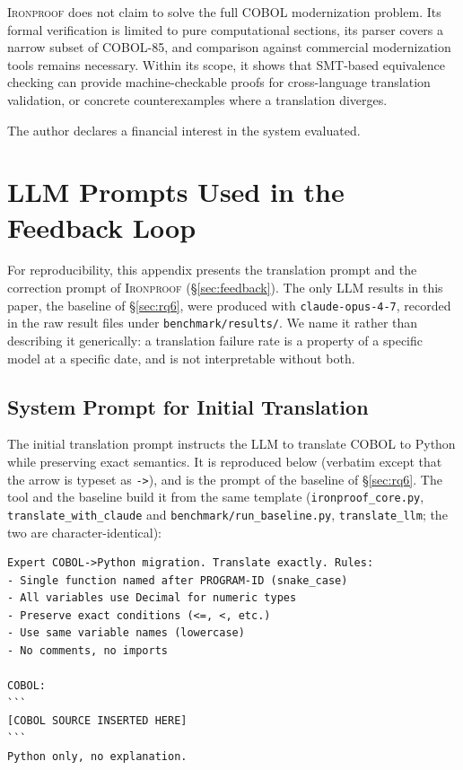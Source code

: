 \documentclass[sigconf,nonacm]{acmart}
\begin{document}
\textsc{Ironproof} does not claim to solve the full COBOL modernization problem. Its formal verification is limited to pure computational sections, its parser covers a narrow subset of COBOL-85, and comparison against commercial modernization tools remains necessary. Within its scope, it shows that SMT-based equivalence checking can provide machine-checkable proofs for cross-language translation validation, or concrete counterexamples where a translation diverges.

\begin{acks}
The author declares a financial interest in the system evaluated.
\end{acks}




\appendix

\section{LLM Prompts Used in the Feedback Loop}\label{app:prompts}

For reproducibility, this appendix presents the translation prompt and the correction prompt of \textsc{Ironproof} (\S\ref{sec:feedback}). The only LLM results in this paper, the baseline of \S\ref{sec:rq6}, were produced with \texttt{claude-opus-4-7}, recorded in the raw result files under \texttt{benchmark/results/}. We name it rather than describing it generically: a translation failure rate is a property of a specific model at a specific date, and is not interpretable without both.

\subsection{System Prompt for Initial Translation}

The initial translation prompt instructs the LLM to translate COBOL to Python while preserving exact semantics. It is reproduced below (verbatim except that the arrow is typeset as \texttt{->}), and is the prompt of the baseline of \S\ref{sec:rq6}. The tool and the baseline build it from the same template (\texttt{ironproof\_core.py}, \texttt{translate\_with\_\allowbreak claude} and \texttt{benchmark/\allowbreak run\_baseline.py}, \texttt{translate\_\allowbreak llm}; the two are character-identical):

\begin{lstlisting}[style=z3style,caption={System prompt for COBOL-to-Python translation, verbatim from the implementation.},label={lst:system-prompt},float=tbp]
Expert COBOL->Python migration. Translate exactly. Rules:
- Single function named after PROGRAM-ID (snake_case)
- All variables use Decimal for numeric types
- Preserve exact conditions (<=, <, etc.)
- Use same variable names (lowercase)
- No comments, no imports

COBOL:
```
[COBOL SOURCE INSERTED HERE]
```
Python only, no explanation.
\end{lstlisting}
\end{document}
